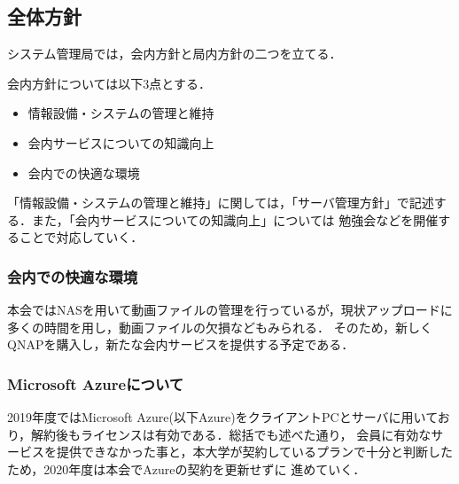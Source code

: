 \subsection*{全体方針}


システム管理局では，会内方針と局内方針の二つを立てる．

会内方針については以下3点とする．
\begin{itemize}
    \item 情報設備・システムの管理と維持
    \item 会内サービスについての知識向上
    \item 会内での快適な環境
\end{itemize}

「情報設備・システムの管理と維持」に関しては，「サーバ管理方針」で記述する．また，「会内サービスについての知識向上」については
勉強会などを開催することで対応していく．
\subsubsection*{会内での快適な環境}
本会ではNASを用いて動画ファイルの管理を行っているが，現状アップロードに多くの時間を用し，動画ファイルの欠損などもみられる．
そのため，新しくQNAPを購入し，新たな会内サービスを提供する予定である．

\subsubsection*{Microsoft Azureについて}
2019年度ではMicrosoft Azure(以下Azure)をクライアントPCとサーバに用いており，解約後もライセンスは有効である．総括でも述べた通り，
会員に有効なサービスを提供できなかった事と，本大学が契約しているプランで十分と判断したため，2020年度は本会でAzureの契約を更新せずに
進めていく．



  
